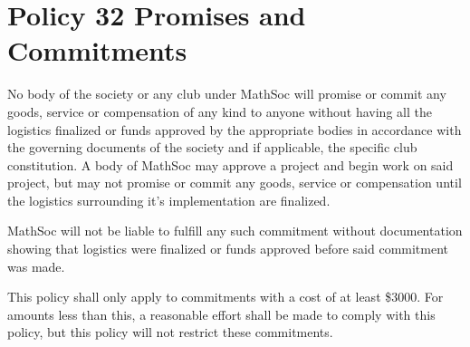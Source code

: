 \section{Policy 32 Promises and Commitments}
No body of the society or any club under MathSoc will promise or commit any goods, service or compensation of any kind to anyone without having all the logistics finalized or funds approved by the appropriate bodies in accordance with the governing documents of the society and if applicable, the specific club constitution. 
A body of MathSoc may approve a project and begin work on said project, but may not promise or commit any goods, service or compensation until the logistics surrounding it's implementation are finalized. 

MathSoc will not be liable to fulfill any such commitment without documentation showing that logistics were finalized or funds approved before said commitment was made.

This policy shall only apply to commitments with a cost of at least \$3000. For amounts less than this, a reasonable effort shall be made to comply with this policy, but this policy will not restrict these commitments.
